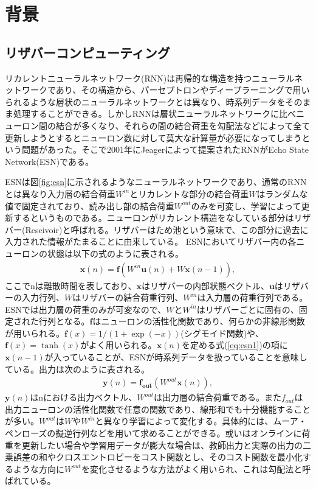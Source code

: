 \documentclass[a4j, twocolumn]{jsarticle}
\begin{document}
\section{背景}
\subsection{リザバーコンピューティング}
リカレントニューラルネットワーク(RNN)は再帰的な構造を持つニューラルネットワークであり、その構造から、パーセプトロンやディープラーニングで用いられるような層状のニューラルネットワークとは異なり、時系列データをそのまま処理することができる。しかしRNNは層状ニューラルネットワークに比べニューロン間の結合が多くなり、それらの間の結合荷重を勾配法などによって全て更新しようとするとニューロン数に対して莫大な計算量が必要になってしまうという問題があった。そこで2001年にJeagerによって提案されたRNNがEcho State Network(ESN)\cite{esn}である。

ESNは図\ref{fig:esn}に示されるようなニューラルネットワークであり、通常のRNNとは異なり入力層の結合荷重$W^{in}$とリカレントな部分の結合荷重$W$はランダムな値で固定されており、読み出し部の結合荷重$W^{out}$のみを可変し、学習によって更新するというものである。ニューロンがリカレント構造をなしている部分はリザバー(Reseivoir)と呼ばれる。リザバーはため池という意味で、この部分に過去に入力された情報がたまることに由来している。
ESNにおいてリザバー内の各ニューロンの状態は以下の式のように表される。
\begin{eqnarray}
\label{eq:esn1}
	\mathbf{x}(n) = \mathbf{f}(W^{in}\mathbf{u}(n) + W\mathbf{x}(n-1)),
\end{eqnarray}
ここでnは離散時間を表しており、$\mathbf{x}$はリザバーの内部状態ベクトル、$\mathbf{u}$はリザバーの入力行列、$W$はリザバーの結合荷重行列、$W^{in}$は入力層の荷重行列である。ESNでは出力層の荷重のみが可変なので、$W$と$W^{in}$はリザバーごとに固有の、固定された行列となる。$\mathbf{f}$はニューロンの活性化関数であり、何らかの非線形関数が用いられる。$\mathbf{f}(x) = 1/(1 + \exp(-x))$(シグモイド関数)や、$\mathbf{f}(x) = \tanh(x)$がよく用いられる。$\mathbf{x}(n)$を定める式(\ref{eq:esn1})の項に$\mathbf{x}(n-1)$が入っていることが、ESNが時系列データを扱っていることを意味している。出力は次のように表される。
\begin{eqnarray}
\label{eq:esn2}
	\mathbf{y}(n) = \mathbf{f_{out}}(W^{out}\mathbf{x}(n)),
\end{eqnarray}
$\mathbf{y}(n)$はnにおける出力ベクトル、$W^{out}$は出力層の結合荷重である。また$f_{out}$は出力ニューロンの活性化関数で任意の関数であり、線形和でも十分機能することが多い。$W^{out}$は$W$や$W^{in}$と異なり学習によって変化する。具体的には、ムーア・ペンローズの擬逆行列などを用いて求めることができる。或いはオンラインに荷重を更新したい場合や学習用データが膨大な場合は、教師出力と実際の出力の二乗誤差の和やクロスエントロピーをコスト関数とし、そのコスト関数を最小化するような方向に$W^{out}$を変化させるような方法がよく用いられ、これは勾配法と呼ばれている。
\end{document}
